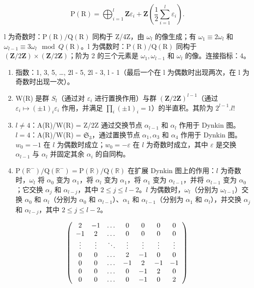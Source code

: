 \[
\mathrm{P} (\mathrm{R}) = \bigoplus_ {i = 1} ^ {l} \mathbf {Z} \varepsilon_ {i} + \mathbf {Z} \left(\frac {1}{2} \sum_ {i = 1} ^ {l} \varepsilon_ {i}\right).
\]

l 为奇数时：\(\mathrm{P}(\mathrm{R})/\mathrm{Q}(\mathrm{R})\) 同构于 Z/4Z，由 \(\omega_{l}\) 的像生成；有 \(\omega_{1} \equiv 2\omega_{l}\) 和 \(\omega_{l-1} \equiv 3\omega_{l} \mod Q(\mathrm{R})\)。l 为偶数时：\(\mathrm{P}(\mathrm{R})/\mathrm{Q}(\mathrm{R})\) 同构于 \((\mathbf{Z}/2\mathbf{Z}) \times (\mathbf{Z}/2\mathbf{Z})\)；阶为 2 的三个元素是 \(\omega_{1}, \omega_{l-1}\) 和 \(\omega_{l}\) 的像。连接指标：4。

\begin{enumerate}
\def\labelenumi{(\Roman{enumi})}
\setcounter{enumi}{8}
\item
  指数：1, 3, 5, \ldots, 2l - 5, 2l - 3, l - 1（最后一个在 l 为偶数时出现两次，在 l 为奇数时出现一次）。
\item
  W(R) 是群 \(S_{l}\)（通过对 \(\varepsilon_{i}\) 进行置换作用）与群 \((\mathbf{Z}/2\mathbf{Z})^{l-1}\)（通过 \(\varepsilon_{i} \mapsto (\pm1)_{i}\varepsilon_{i}\) 作用，并满足 \(\prod_{i}(\pm1)_{i} = 1\)）的半直积。其阶为 \(2^{l-1}.l!\)
\item
  \(l \neq 4\)：A(R)/W(R) = Z/2Z 通过交换节点 \(\alpha_{l-1}\) 和 \(\alpha_l\) 作用于 Dynkin 图。\(l = 4\)：A(R)/W(R) = \(\mathfrak{S}_3\)，通过置换节点 \(\alpha_1, \alpha_3\) 和 \(\alpha_4\) 作用于 Dynkin 图。\(w_0 = -1\) 在 \(l\) 为偶数时成立；\(w_0 = -\varepsilon\) 在 \(l\) 为奇数时成立，其中 \(\varepsilon\) 是交换 \(\alpha_{l-1}\) 与 \(\alpha_l\) 并固定其余 \(\alpha_i\) 的自同构。
\item
  \(\mathrm{P}(\mathbb{R}^{-}) / \mathrm{Q}(\mathbb{R}^{-}) = \mathrm{P}(\mathbb{R}) / \mathrm{Q}(\mathbb{R})\) 在扩展 Dynkin 图上的作用：\(l\) 为奇数时，\(\omega_l\) 将 \(\alpha_0\) 变为 \(\alpha_1\)，将 \(\alpha_l\) 变为 \(\alpha_1\)，将 \(\alpha_1\) 变为 \(\alpha_{l-1}\)，并将 \(\alpha_{l-1}\) 变为 \(\alpha_0\)；它交换 \(\alpha_j\) 和 \(\alpha_{l-j}\)，其中 \(2 \leqslant j \leqslant l - 2\)。\(l\) 为偶数时，\(\omega_l\)（分别为 \(\omega_{l-1}\)）交换 \(\alpha_0\) 和 \(\alpha_l\)（分别为 \(\alpha_0\) 和 \(\alpha_{l-1}\)）、\(\alpha_1\) 和 \(\alpha_{l-1}\)（分别为 \(\alpha_1\) 和 \(\alpha_l\)），并交换 \(\alpha_j\) 和 \(\alpha_{l-j}\)，其中 \(2 \leqslant j \leqslant l - 2\)。
\end{enumerate}

\[
\left( \begin{array}{c c c c c c c} 2 & - 1 & \dots & 0 & 0 & 0 & 0 \\ - 1 & 2 & \dots & 0 & 0 & 0 & 0 \\ \vdots & \vdots & \ddots & \vdots & \vdots & \vdots & \vdots \\ 0 & 0 & \dots & 2 & - 1 & 0 & 0 \\ 0 & 0 & \dots & - 1 & 2 & - 1 & - 1 \\ 0 & 0 & \dots & 0 & - 1 & 2 & 0 \\ 0 & 0 & \dots & 0 & - 1 & 0 & 2 \end{array} \right)
\]

